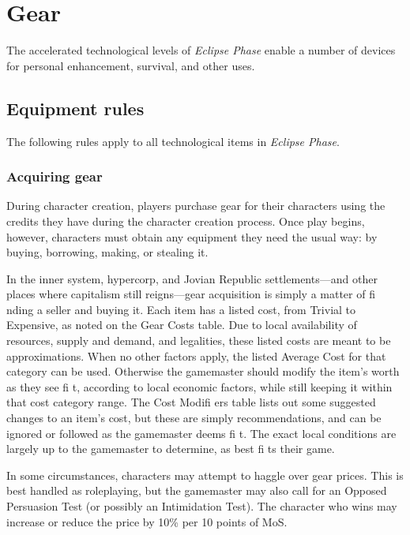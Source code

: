 
\chapter{Gear}
\label{cha:gear}

The accelerated technological levels of \emph{Eclipse Phase}
enable a number of devices for personal enhancement,
survival, and other uses.


\section{Equipment rules}
\label{sec:equipment-rules}

The following rules apply to all technological items in
\emph{Eclipse Phase}.


\subsection{Acquiring gear}
\label{sec:acquiring-gear}

During character creation, players purchase gear for
their characters using the credits they have during
the character creation process. Once play begins,
however, characters must obtain any equipment they
need the usual way: by buying, borrowing, making,
or stealing it.

In the inner system, hypercorp, and Jovian Republic
settlements—and other places where capitalism still
reigns—gear acquisition is simply a matter of fi nding
a seller and buying it. Each item has a listed cost, from
Trivial to Expensive, as noted on the Gear Costs table.
Due to local availability of resources, supply and
demand, and legalities, these listed costs are meant
to be approximations. When no other factors apply,
the listed Average Cost for that category can be used.
Otherwise the gamemaster should modify the item’s
worth as they see fi t, according to local economic factors,
while still keeping it within that cost category
range. The Cost Modifi ers table lists out some suggested
changes to an item’s cost, but these are simply
recommendations, and can be ignored or followed as
the gamemaster deems fi t. The exact local conditions
are largely up to the gamemaster to determine, as best
fi ts their game.

In some circumstances, characters may attempt to
haggle over gear prices. This is best handled as roleplaying,
but the gamemaster may also call for an
Opposed Persuasion Test (or possibly an Intimidation
Test). The character who wins may increase or reduce
the price by 10\% per 10 points of MoS.

